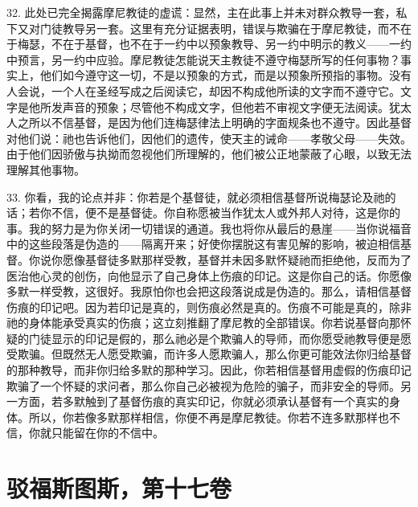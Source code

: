 32. 此处已完全揭露摩尼教徒的虚谎：显然，主在此事上并未对群众教导一套，私下又对门徒教导另一套。这里有充分证据表明，错误与欺骗在于摩尼教徒，而不在于梅瑟，不在于基督，也不在于一约中以预象教导、另一约中明示的教义——一约中预言，另一约中应验。摩尼教徒怎能说天主教徒不遵守梅瑟所写的任何事物？事实上，他们如今遵守这一切，不是以预象的方式，而是以预象所预指的事物。没有人会说，一个人在圣经写成之后阅读它，却因不构成他所读的文字而不遵守它。文字是他所发声音的预象；尽管他不构成文字，但他若不审视文字便无法阅读。犹太人之所以不信基督，是因为他们连梅瑟律法上明确的字面规条也不遵守。因此基督对他们说：祂也告诉他们，因他们的遗传，使天主的诫命——孝敬父母——失效。由于他们因骄傲与执拗而忽视他们所理解的，他们被公正地蒙蔽了心眼，以致无法理解其他事物。\par

33. 你看，我的论点并非：你若是个基督徒，就必须相信基督所说梅瑟论及祂的话；若你不信，便不是基督徒。你自称愿被当作犹太人或外邦人对待，这是你的事。我的努力是为你关闭一切错误的通道。我也将你从最后的悬崖——当你说福音中的这些段落是伪造的——隔离开来；好使你摆脱这有害见解的影响，被迫相信基督。你说你愿像基督徒多默那样受教，基督并未因多默怀疑祂而拒绝他，反而为了医治他心灵的创伤，向他显示了自己身体上伤痕的印记。这是你自己的话。你愿像多默一样受教，这很好。我原怕你也会把这段落说成是伪造的。那么，请相信基督伤痕的印记吧。因为若印记是真的，则伤痕必然是真的。伤痕不可能是真的，除非祂的身体能承受真实的伤痕；这立刻推翻了摩尼教的全部错误。你若说基督向那怀疑的门徒显示的印记是假的，那么祂必是个欺骗人的导师，而你愿受祂教导便是愿受欺骗。但既然无人愿受欺骗，而许多人愿欺骗人，那么你更可能效法你归给基督的那种教导，而非你归给多默的那种学习。因此，你若相信基督用虚假的伤痕印记欺骗了一个怀疑的求问者，那么你自己必被视为危险的骗子，而非安全的导师。另一方面，若多默触到了基督伤痕的真实印记，你就必须承认基督有一个真实的身体。所以，你若像多默那样相信，你便不再是摩尼教徒。你若不连多默那样也不信，你就只能留在你的不信中。\par



\section{驳福斯图斯，第十七卷}

